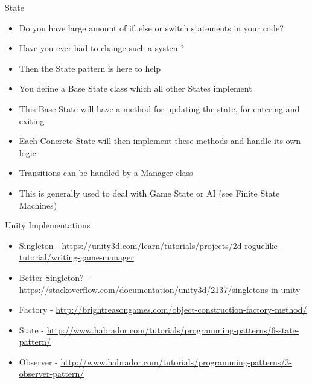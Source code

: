 \begin{frame}{State}
	\begin{itemize}
		\item Do you have large amount of if..else or switch statements in your code?
		\item Have you ever had to change such a system?
		\item Then the State pattern is here to help
		\item You define a Base State class which all other States implement
		\item This Base State will have a method for updating the state, for entering and exiting
		\item Each Concrete State will then implement these methods and handle its own logic 
		\item Transitions can be handled by a Manager class
		\item This is generally used to deal with Game State or AI (see Finite State Machines)
	\end{itemize}
\end{frame}

\begin{frame}{Unity Implementations}
	\begin{itemize}
		\item Singleton - \url{https://unity3d.com/learn/tutorials/projects/2d-roguelike-tutorial/writing-game-manager}
		\item Better Singleton? - \url{https://stackoverflow.com/documentation/unity3d/2137/singletons-in-unity}
		\item Factory - \url{http://brightreasongames.com/object-construction-factory-method/}
		\item State - \url{http://www.habrador.com/tutorials/programming-patterns/6-state-pattern/}
		\item Observer -
		\url{http://www.habrador.com/tutorials/programming-patterns/3-observer-pattern/}
		
	\end{itemize}
\end{frame}